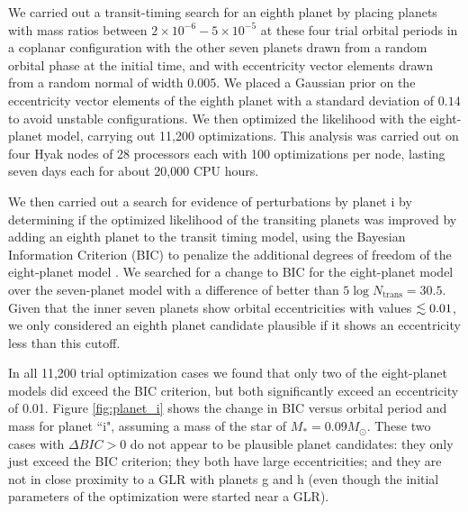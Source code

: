\documentclass[twocolumn]{aastex63}
\begin{document}
We carried out a transit-timing search for an eighth planet by placing
planets with mass ratios between $2\times 10^{-6}-5\times 10^{-5}$ at 
these four trial orbital periods
in a coplanar configuration with the other seven planets drawn from
a random orbital phase at the initial time, and with eccentricity
vector elements drawn from a random normal of width 0.005.   We
placed a Gaussian prior on the eccentricity vector elements of the eighth planet
with a standard deviation of $0.14$ to avoid unstable configurations.
We then optimized the likelihood with the eight-planet model, carrying
out 11,200 optimizations.  This analysis was carried out on four Hyak nodes of 28 processors each with 100 optimizations per node, lasting seven days each for about 20,000 CPU hours.

We then carried out a search for evidence of perturbations by planet i by
determining if the optimized likelihood of the transiting planets was improved
by adding an eighth planet to the transit timing model, using
the Bayesian Information Criterion (BIC) to penalize the additional degrees
of freedom of the eight-planet model \citep{Wit2012}.  We searched for a change 
to BIC for the eight-planet model over the seven-planet model with a difference
of better than $5\log{N_\mathrm{trans}} = 30.5$.  Given that the inner seven
planets show orbital eccentricities with values $\lesssim 0.01$, we only considered
an eighth planet candidate plausible if it shows an eccentricity less than
this cutoff.

In all 11,200 trial optimization cases we found that only two of the eight-planet models 
did exceed the BIC criterion, but both significantly exceed an eccentricity
of 0.01.  Figure  \ref{fig:planet_i} shows the change in BIC versus
orbital period and mass for planet ``i", assuming a mass of the star
of $M_* = 0.09 M_\odot$.   These two cases with $\Delta BIC {>} 0$
do not appear to be plausible
planet candidates:  they only just exceed the BIC criterion;  they
both have large eccentricities; and they are not in close proximity to a
GLR with planets g and h (even though the initial parameters of the optimization were started near a GLR).
\end{document}
